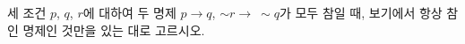 세 조건 $p$, $q$, $r$에 대하여 두 명제 $p\longrightarrow q$, $\sim r\longrightarrow\ \sim q$가 모두 참일 때, 보기에서 항상 참인 명제인 것만을 있는 대로 고르시오. 
